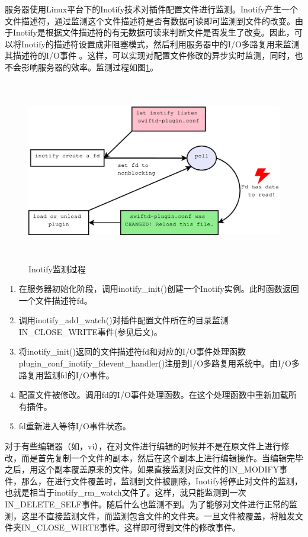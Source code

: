 \documentclass[twoside, xetex]{report}
\begin{document}
	服务器使用Linux平台下的Inotify技术对插件配置文件进行监测。Inotify产生一个文件描述符，通过监测这个文件描述符是否有数据可读即可监测到文件的改变。由于Inotify是根据文件描述符的有无数据可读来判断文件是否发生了改变。因此，可以将Inotify的描述符设置成非阻塞模式，然后利用服务器中的I/O多路复用来监测其描述符的I/O事件 。这样，可以实现对配置文件修改的异步实时监测，同时，也不会影响服务器的效率。监测过程如图\ref{inotify}。
	
	\begin{figure}[htbp]
	\centering
	\includegraphics[height=8cm, width=15cm]{pics/inotify.eps}
	\caption{Inotify监测过程}
	\label{inotify}
	\end{figure}
	
	\begin{enumerate}
		\item 在服务器初始化阶段，调用inotify\_init()创建一个Inotify实例。此时函数返回一个文件描述符fd。
		\item 调用inotify\_add\_watch()对插件配置文件所在的目录监测IN\_CLOSE\_WRITE事件(参见后文)。
		\item 将inotify\_init()返回的文件描述符fd和对应的I/O事件处理函数\\plugin\_conf\_inotify\_fdevent\_handler()注册到I/O多路复用系统中。由I/O多路复用监测fd的I/O事件。
		\item 配置文件被修改。调用fd的I/O事件处理函数。在这个处理函数中重新加载所有插件。
		\item fd重新进入等待I/O事件状态。
	\end{enumerate}
	
	对于有些编辑器（如，vi），在对文件进行编辑的时候并不是在原文件上进行修改，而是首先复制一个文件的副本，然后在这个副本上进行编辑操作。当编辑完毕之后，用这个副本覆盖原来的文件。如果直接监测对应文件的IN\_MODIFY事件，那么，在进行文件覆盖时，监测到文件被删除，Inotify将停止对文件的监测，也就是相当于inotify\_rm\_watch文件了。这样，就只能监测到一次IN\_DELETE\_SELF事件。随后什么也监测不到。为了能够对文件进行正常的监测，这里不直接监测文件，而监测包含文件的文件夹。一旦文件被覆盖，将触发文件夹IN\_CLOSE\_WIRTE事件。这样即可得到文件的修改事件。
	
\end{document}
